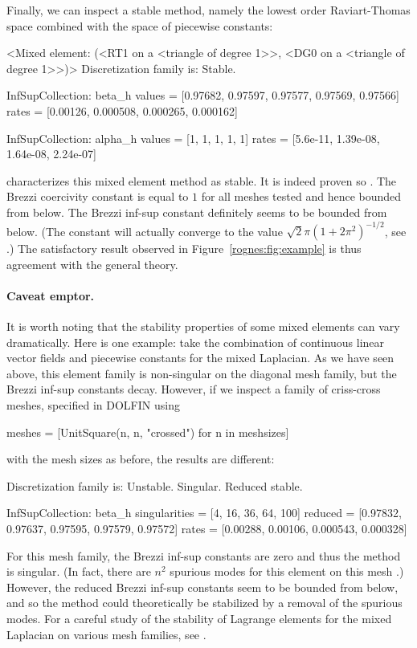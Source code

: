 Finally, we can inspect a stable method, namely the lowest order
Raviart-Thomas space combined with the space of piecewise constants:
\begin{python}
<Mixed element: (<RT1 on a <triangle of degree 1>>,
<DG0 on a <triangle of degree 1>>)>
Discretization family is: Stable.

InfSupCollection: beta_h
values =         [0.97682, 0.97597, 0.97577, 0.97569, 0.97566]
rates  =         [0.00126, 0.000508, 0.000265, 0.000162]

InfSupCollection: alpha_h
values =         [1, 1, 1, 1, 1]
rates  =         [5.6e-11, 1.39e-08, 1.64e-08, 2.24e-07]
\end{python}
\rognesascot{} characterizes this mixed element method as stable. It
is indeed proven so \citep{RaviartThomas1977}. The Brezzi coercivity
constant is equal to $1$ for all meshes tested and hence bounded from
below. The Brezzi inf-sup constant definitely seems to be bounded from
below. (The constant will actually converge to the value $\sqrt{2} \pi
(1 + 2 \pi^2)^{-1/2}$, see \citep{ArnoldRognes2009}.)  The satisfactory
result observed in
Figure~\ref{rognes:fig:example} is thus
agreement with the general theory.

\paragraph*{Caveat emptor.}

It is worth noting that the stability properties of some mixed
elements can vary dramatically. Here is one example: take the
combination of continuous linear vector fields and piecewise constants
for the mixed Laplacian. As we have seen above, this element family is
non-singular on the diagonal mesh family, but the Brezzi inf-sup
constants decay. However, if we inspect a family of criss-cross
meshes, specified in DOLFIN using
\begin{python}
meshes = [UnitSquare(n, n, "crossed") for n in meshsizes]
\end{python}
with the mesh sizes as before, the results are different:
\begin{python}
Discretization family is: Unstable. Singular. Reduced stable.

InfSupCollection: beta_h
singularities = [4, 16, 36, 64, 100]
reduced =        [0.97832, 0.97637, 0.97595, 0.97579, 0.97572]
rates  =         [0.00288, 0.00106, 0.000543, 0.000328]
\end{python}
For this mesh family, the Brezzi inf-sup constants are zero and thus
the method is singular. (In fact, there are $n^2$ spurious modes for
this element on this mesh \citep{Qin1994}.) However, the reduced Brezzi
inf-sup constants seem to be bounded from below, and so the method
could theoretically be stabilized by a removal of the spurious
modes. For a careful study of the stability of Lagrange elements for
the mixed Laplacian on various mesh families, see \citet{ArnoldRognes2009}.

